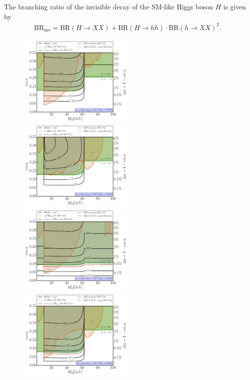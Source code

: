 \documentclass[../report.tex]{subfiles}
\newcommand{\BRHinv}{\mathrm{BR}_\mathrm{inv}}
\begin{document}
The branching ratio of the invisible decay of the SM-like Higgs boson $H$ is given by
\begin{align}
\BRHinv = \mathrm{BR}(H\to XX) + \mathrm{BR}(H\to hh) \cdot \mathrm{BR}(h\to XX)^2.
\end{align}
 
\begin{figure}[t]
\centering
\includegraphics[width=0.5\textwidth]{section6/mh_cosa_vs50vH_lamSX0p0001_MX5GeV_LEPBRinvkunikgga}\hfill
\includegraphics[width=0.5\textwidth]{section6/mh_cosa_vs50vH_lamSX0p000001_MX5GeV_LEPBRinvkunikgga}\\
\includegraphics[width=0.5\textwidth]{section6/mh_cosa_vs50vH_lamSX0p001_MX5GeV_LEPBRinvkunikgga}\hfill
\includegraphics[width=0.5\textwidth]{section6/mh_cosa_vs5vH_lamSX0p0001_MX5GeV_LEPBRinvkunikgga}

\end{figure}
\end{document}
